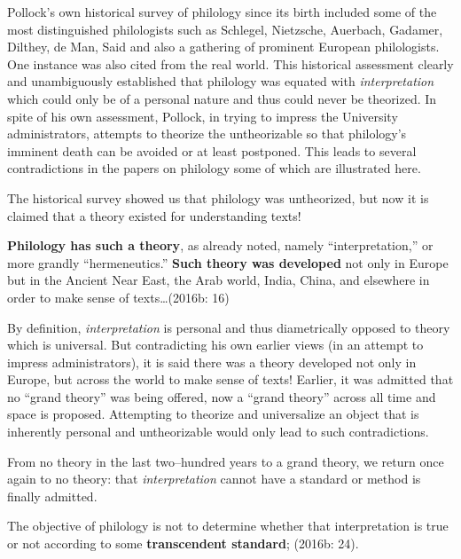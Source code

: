 Pollock’s own historical survey of philology since its birth included some of the most distinguished philologists such as Schlegel, Nietzsche, Auerbach, Gadamer, Dilthey, de Man, Said and also a gathering of prominent European philologists. One instance was also cited from the real world. This historical assessment clearly and unambiguously established that philology was equated with \textit{interpretation} which could only be of a personal nature and thus could never be theorized. In spite of his own assessment, Pollock, in trying to impress the University administrators, attempts to theorize the untheorizable so that philology’s imminent death can be avoided or at least postponed. This leads to several contradictions in the papers on philology some of which are illustrated here.

The historical survey showed us that philology was untheorized, but now it is claimed that a theory existed for understanding texts!

\begin{myquote}
\textbf{Philology has such a theory}, as already noted, namely “interpretation,” or more grandly “hermeneutics.” \textbf{Such theory was developed} not only in Europe but in the Ancient Near East, the Arab world, India, China, and elsewhere in order to make sense of texts…(2016b: 16)
\end{myquote}

By definition, \textit{interpretation} is personal and thus diametrically opposed to theory which is universal. But contradicting his own earlier views (in an attempt to impress administrators), it is said there was a theory developed not only in Europe, but across the world to make sense of texts! Earlier, it was admitted that no “grand theory” was being offered, now a “grand theory” across all time and space is proposed. Attempting to theorize and universalize an object that is inherently personal and untheorizable would only lead to such contradictions.

From no theory in the last two–hundred years to a grand theory, we return once again to no theory: that \textit{interpretation} cannot have a standard or method is finally admitted.

\begin{myquote}
The objective of philology is not to determine whether that interpretation is true or not according to some \textbf{transcendent standard}; (2016b: 24).
\end{myquote}

